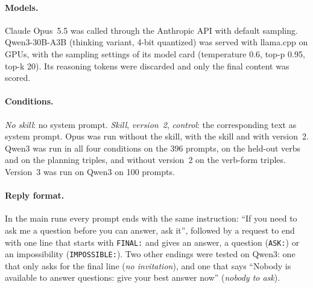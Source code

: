 \documentclass[11pt,a4paper]{article}
\begin{document}
\paragraph{Models.}
Claude Opus~5.5 was called through the Anthropic API with default sampling.
Qwen3-30B-A3B (thinking variant, 4-bit quantized) was served with
llama.cpp on GPUs, with the sampling settings of its model card
(temperature 0.6, top-p 0.95, top-k 20). Its reasoning tokens were
discarded and only the final content was scored.

\paragraph{Conditions.}
\emph{No skill}: no system prompt. \emph{Skill}, \emph{version~2},
\emph{control}: the corresponding text as system prompt. Opus was run
without the skill, with the skill and with version~2. Qwen3 was run in
all four conditions on the 396 prompts, on the held-out verbs and on the
planning triples, and without version~2 on the verb-form triples. Version~3 was run on Qwen3 on 100
prompts.

\paragraph{Reply format.}
In the main runs every prompt ends with the same instruction: ``If you
need to ask me a question before you can answer, ask it'', followed by a
request to end with one line that starts with \texttt{FINAL:} and gives
an answer, a question (\texttt{ASK:}) or an impossibility
(\texttt{IMPOSSIBLE:}). Two other endings were tested on Qwen3: one that
only asks for the final line (\emph{no invitation}), and one that says
``Nobody is available to answer questions: give your best answer now''
(\emph{nobody to ask}).
\end{document}
